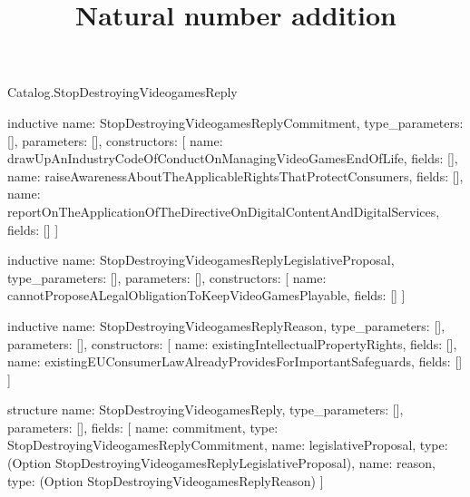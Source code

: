 \begin{lexlean}{Catalog.StopDestroyingVideogamesReply}
\title{Natural number addition}
\begin{semanticmodule}
inductive{
  name: StopDestroyingVideogamesReplyCommitment,
  type_parameters: [],
  parameters: [],
  constructors: [
    {name: drawUpAnIndustryCodeOfConductOnManagingVideoGamesEndOfLife, fields: []},
    {name: raiseAwarenessAboutTheApplicableRightsThatProtectConsumers, fields: []},
    {name: reportOnTheApplicationOfTheDirectiveOnDigitalContentAndDigitalServices, fields: []}
  ]
}

inductive{
  name: StopDestroyingVideogamesReplyLegislativeProposal,
  type_parameters: [],
  parameters: [],
  constructors: [
    {name: cannotProposeALegalObligationToKeepVideoGamesPlayable, fields: []}
  ]
}

inductive{
  name: StopDestroyingVideogamesReplyReason,
  type_parameters: [],
  parameters: [],
  constructors: [
    {name: existingIntellectualPropertyRights, fields: []},
    {name: existingEUConsumerLawAlreadyProvidesForImportantSafeguards, fields: []}
  ]
}

structure{
  name: StopDestroyingVideogamesReply,
  type_parameters: [],
  parameters: [],
  fields: [
    {name: commitment, type: StopDestroyingVideogamesReplyCommitment},
    {name: legislativeProposal, type: (Option StopDestroyingVideogamesReplyLegislativeProposal)},
    {name: reason, type: (Option StopDestroyingVideogamesReplyReason)}
  ]
}
\end{semanticmodule}
\end{lexlean}
